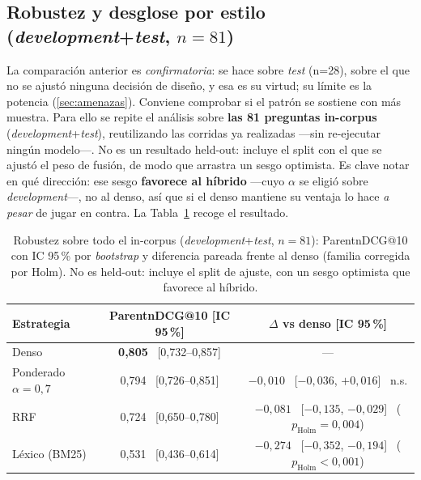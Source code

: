 \subsection{Robustez y desglose por estilo (\emph{development}+\emph{test}, \texorpdfstring{$n=81$}{n=81})}
\label{subsec:flagship-robustez}

La comparación anterior es \emph{confirmatoria}: se hace sobre \emph{test} (n=28), sobre el que no se ajustó ninguna decisión de diseño, y esa es su virtud; su límite es la potencia (\ref{sec:amenazas}). Conviene comprobar si el patrón se sostiene con más muestra. Para ello se repite el análisis sobre \textbf{las 81 preguntas in-corpus} (\emph{development}+\emph{test}), reutilizando las corridas ya realizadas —sin re-ejecutar ningún modelo—. No es un resultado held-out: incluye el split con el que se ajustó el peso de fusión, de modo que arrastra un sesgo optimista. Es clave notar en qué dirección: ese sesgo \textbf{favorece al híbrido} —cuyo $\alpha$ se eligió sobre \emph{development}—, no al denso, así que si el denso mantiene su ventaja lo hace \emph{a pesar} de jugar en contra. La Tabla~\ref{tab:flagship-robustez} recoge el resultado.

\begin{table}[htbp]
    \centering
    \small
    \renewcommand{\arraystretch}{1.2}
    \caption{Robustez sobre todo el in-corpus (\emph{development}+\emph{test}, $n=81$): ParentnDCG@10 con IC 95\,\% por \emph{bootstrap} y diferencia pareada frente al denso (familia corregida por Holm). No es held-out: incluye el split de ajuste, con un sesgo optimista que favorece al híbrido.}
    \label{tab:flagship-robustez}
    \begin{tabular}{|l|c|c|}
        \hline
        \textbf{Estrategia} & \textbf{ParentnDCG@10 [IC 95\,\%]} & \textbf{$\Delta$ vs denso [IC 95\,\%]} \\
        \hline
        Denso                     & \textbf{0,805} \ [0,732--0,857] & --- \\
        Ponderado $\alpha{=}0{,}7$ & 0,794 \ [0,726--0,851] & $-0{,}010$ \ [$-0{,}036$, $+0{,}016$] \ n.s. \\
        RRF                       & 0,724 \ [0,650--0,780] & $-0{,}081$ \ [$-0{,}135$, $-0{,}029$] \ ($p_{\text{Holm}}{=}0{,}004$) \\
        Léxico (BM25)             & 0,531 \ [0,436--0,614] & $-0{,}274$ \ [$-0{,}352$, $-0{,}194$] \ ($p_{\text{Holm}}{<}0{,}001$) \\
        \hline
    \end{tabular}
\end{table}

